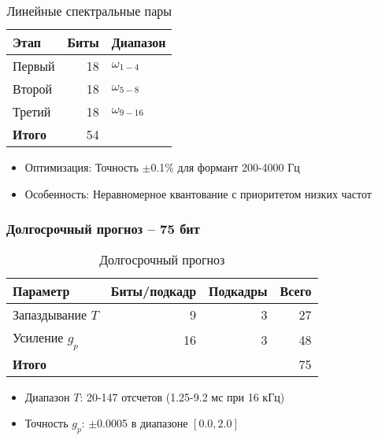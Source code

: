 \documentclass{report}
\begin{document}
	\begin{table}[H]
		\centering
		\caption{Линейные спектральные пары}
		\begin{tabular}{lrl}
			\toprule
				Этап & Биты & Диапазон \\
			\midrule
				Первый & 18 & $\omega_{1-4}$ \\
				Второй & 18 & $\omega_{5-8}$ \\ 
				Третий & 18 & $\omega_{9-16}$ \\
			\bottomrule
				\textbf{Итого} & 54 & \\
			\bottomrule
		\end{tabular}
	\end{table}
	
	\begin{itemize}
		\item Оптимизация: Точность $\pm$0.1\% для формант 200-4000 Гц
		\item Особенность: Неравномерное квантование с приоритетом низких частот
	\end{itemize}

	\subsubsection{Долгосрочный прогноз -- 75 бит}
	\begin{table}[H]
		\centering
		\caption{Долгосрочный прогноз}
		\begin{tabular}{lrrr}
			\toprule
				\textbf{Параметр} & \textbf{Биты/подкадр} & \textbf{Подкадры} & \textbf{Всего} \\
			\midrule
				Запаздывание $T$ & 9 & 3 & 27 \\
				Усиление $g_p$ & 16 & 3 & 48 \\
			\bottomrule
				\textbf{Итого} & & & 75 \\
			\bottomrule
		\end{tabular}
	\end{table}
	
	\begin{itemize}
		\item Диапазон $T$: 20-147 отсчетов (1.25-9.2 мс при 16 кГц)
		\item Точность $g_p$: $\pm$0.0005 в диапазоне $[0.0, 2.0]$
	\end{itemize}
\end{document}
